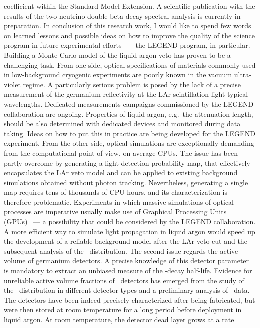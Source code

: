coefficient within the Standard Model Extension. A scientific publication with the results
of the two-neutrino double-beta decay spectral analysis is currently in preparation.
\newpar
In conclusion of this research work, I would like to spend few words on learned lessons
and possible ideas on how to improve the quality of the science program in future
experimental efforts~---~the LEGEND program, in particular. Building a Monte Carlo model
of the liquid argon veto has proven to be a challenging task. From one side, optical
specifications of materials commonly used in low-background cryogenic experiments are
poorly known in the vacuum ultra-violet regime. A particularly serious problem is posed by
the lack of a precise measurement of the germanium reflectivity at the LAr scintillation
light typical wavelengths. Dedicated measurements campaigns commissioned by the LEGEND
collaboration are ongoing.  Properties of liquid argon, e.g.~the attenuation length,
should be also determined with dedicated devices and monitored during data taking. Ideas
on how to put this in practice are being developed for the LEGEND experiment. From the
other side, optical simulations are exceptionally demanding from the computational point
of view, on average CPUs. The issue has been partly overcome by generating a
light-detection probability map, that effectively encapsulates the LAr veto model and can
be applied to existing background simulations obtained without photon tracking.
Nevertheless, generating a single map requires tens of thousands of CPU hours, and its
characterization is therefore problematic. Experiments in which massive simulations of
optical processes are imperative usually make use of Graphical Processing Units
(GPUs)~\cite{Merck2012, Blyth2019} --- a possibility that could be considered by the
LEGEND collaboration. A more efficient way to simulate light propagation in liquid argon
would speed up the development of a reliable background model after the LAr veto cut and
the subsequent analysis of the \nnbb\ distribution.
\newpar
The second issue regards the active volume of germanium detectors. A precise knowledge of
this detector parameter is mandatory to extract an unbiased measure of the \nnbb-decay
half-life. Evidence for unreliable active volume fractions of \bege\ detectors has emerged
from the study of the \nnbb\ distribution in different detector types and a preliminary
analysis of \Arl\ data.  The detectors have been indeed precisely characterized after
being fabricated, but were then stored at room temperature for a long period before
deployment in liquid argon. At room temperature, the detector dead layer grows at a rate
